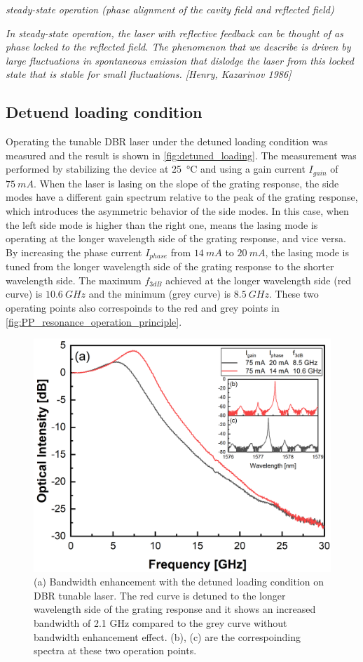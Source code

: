 \textit{steady-state operation (phase alignment of the cavity field and reflected field)}

\textit{In steady-state operation, the laser with reflective feedback can be thought of as phase locked to the reflected field. The phenomenon that we describe is driven by large fluctuations in spontaneous emission that dislodge the laser from this locked state that is stable for small fluctuations. [Henry, Kazarinov 1986]}

\subsection{Detuend loading condition}\label{subsec:detuned_laoding_measurement}
Operating the tunable DBR laser under the detuned loading condition was measured and the result is shown in \autoref{fig:detuned_loading}. The measurement was performed by stabilizing the device at \SI{25}{\celsius} and using a gain current $I_{gain}$ of $75 \ mA$. When the laser is lasing on the slope of the grating response, the side modes have a different gain spectrum relative to the peak of the grating response, which introduces the asymmetric behavior of the side modes. In this case, when the left side mode is higher than the right one, means the lasing mode is operating at the longer wavelength side of the grating response, and vice versa. By increasing the phase current $I_{phase}$ from $14 \ mA$ to $20 \ mA$, the lasing mode is tuned from the longer wavelength side of the grating response to the shorter wavelength side. The maximum $f_{3dB}$ achieved at the longer wavelength side (red curve) is $10.6 \ GHz$ and the minimum (grey curve) is $8.5 \ GHz$. These two operating points also correspoinds to the red and grey points in \autoref{fig:PP_resonance_operation_principle}.

\begin{figure}[ht]
    \centering
    \includegraphics[width=.6\linewidth]{figures/detuned_loading.png}
    \caption{(a) Bandwidth enhancement with the detuned loading condition on DBR tunable laser. The red curve is detuned to the longer wavelength side of the grating response and it shows an increased bandwidth of 2.1 GHz compared to the grey curve without bandwidth enhancement effect. (b), (c) are the correspoinding spectra at these two operation points.}
    \label{fig:detuned_loading}
\end{figure}


